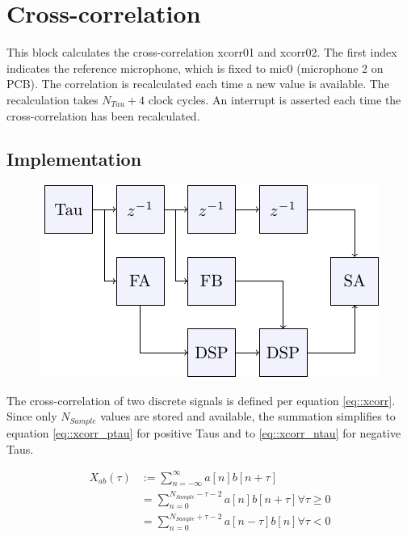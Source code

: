 \section{Cross-correlation}
\label{sec::cic}

This block calculates the cross-correlation xcorr01 and xcorr02.
The first index indicates the reference microphone, which is fixed to mic0 (microphone 2 on PCB).
The correlation is recalculated each time a new value is available.
The recalculation takes $N_{Tau}+4$ clock cycles.
An interrupt is asserted each time the cross-correlation has been recalculated.

\subsection{Implementation}
\begin{figure}[h]
	\centering
	\includegraphics[scale = 1.5]{block_diagram/xcorr_diag.pdf}
	\label{fig::block_diag}
\end{figure}

The cross-correlation of two discrete signals is defined per equation \ref{eq::xcorr}.
Since only $N_{Sample}$ values are stored and available, the summation simplifies to equation \ref{eq::xcorr_ptau} for positive Taus and to \ref{eq::xcorr_ntau} for negative Taus.

\begin{align}
X_{ab}(\tau) &:= \sum_{n=-\infty}^{\infty}a\left[n\right]b\left[n+\tau\right] \label{eq::xcorr}\\
&= \sum_{n=0}^{N_{Sample}-\tau-2}a\left[n\right]b\left[n+\tau\right] \forall\tau\ge0 \label{eq::xcorr_ptau} \\
&= \sum_{n=0}^{N_{Sample}+\tau-2}a\left[n-\tau\right]b\left[n\right] \forall\tau<0 \label{eq::xcorr_ntau} \\	
\end{align}

